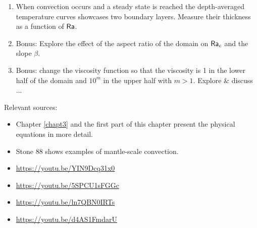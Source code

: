\begin{enumerate}
\item When convection occurs and a steady state is reached the depth-averaged temperature
curves showcases two boundary layers. Measure their thickness as a function of ${\mathsf{Ra}}$.

\item Bonus: Explore the effect of the aspect ratio of the domain on ${\mathsf{Ra}}_c$ and the slope $\beta$.

\item Bonus: change the viscosity function so that the viscosity is 1 in the lower half of the domain 
and $10^m$ in the upper half with $m>1$. Explore \& discuss ...

\end{enumerate}


\vspace{2cm}

Relevant sources:
\begin{itemize}
\item Chapter \ref{chapt3} and the first part of this chapter present the physical equations in more detail. 
\item Stone 88 shows examples of mantle-scale convection.
\item \url{https://youtu.be/YIN9Dcq31x0}
\item \url{https://youtu.be/5SPCU1sFGGc}
\item \url{https://youtu.be/ln7QBN0IRTs}
\item \url{https://youtu.be/d4AS1FmdarU}
\end{itemize} 


